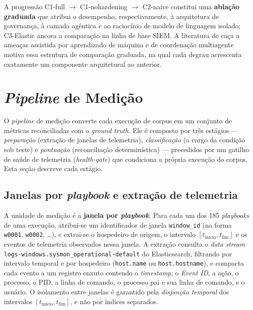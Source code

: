 A progressão C1-full $\rightarrow$ C1-nohardening $\rightarrow$ C2-naive
constitui uma \textbf{ablação graduada} que atribui o desempenho,
respectivamente, à arquitetura de governança, à camada agêntica e ao raciocínio
de modelo de linguagem isolado; C3-Elastic ancora a comparação na linha de base
SIEM. A literatura de caça a ameaças assistida por aprendizado de máquina
\cite{ali2023huntgptintegratingmachinelearningbased} e de coordenação
multiagente \cite{mahmud2025distributedmultiagentcoordinationusing} motiva
essa estrutura de comparação graduada, na qual cada degrau acrescenta exatamente
um componente arquitetural ao anterior.

\section{\textit{Pipeline} de Medição}
\label{sec:met-pipeline}

O \textit{pipeline} de medição converte cada execução de corpus em um conjunto de
métricas reconciliadas com o \textit{ground truth}. Ele é composto por três
estágios --- \emph{preparação} (extração de janelas de telemetria),
\emph{classificação} (a cargo da condição sob teste) e \emph{pontuação}
(reconciliação determinística) --- precedidos por um gatilho de saúde de
telemetria (\textit{health-gate}) que condiciona a própria execução do corpus.
Esta seção descreve cada estágio.

\subsection{Janelas por \textit{playbook} e extração de telemetria}

A unidade de medição é a \textbf{janela por \textit{playbook}}. Para cada um dos
185 \textit{playbooks} de uma execução, atribui-se um identificador de janela
\texttt{window\_id} (na forma \texttt{w0001}, \texttt{w0002}, \dots), e extrai-se
o hospedeiro de origem, o intervalo $[t_{\text{início}}, t_{\text{fim}}]$ e os
eventos de telemetria observados nessa janela. A extração consulta o
\textit{data stream} \texttt{logs-windows.sysmon\_operational-default} do
Elasticsearch, filtrando por intervalo temporal e por hospedeiro
(\texttt{host.name} ou \texttt{host.hostname}), e compacta cada evento a um
registro enxuto contendo o \textit{timestamp}, o \textit{Event ID}, a ação, o
processo, o PID, a linha de comando, o processo pai e sua linha de comando, e o
usuário. O isolamento entre janelas é garantido pela \emph{disjunção temporal}
dos intervalos $[t_{\text{início}}, t_{\text{fim}}]$, e não por índices
separados.

